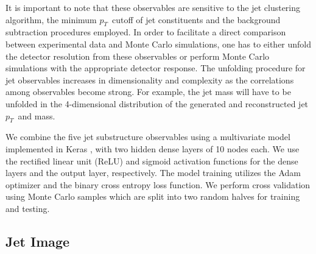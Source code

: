 \documentclass[notoc]{JHEP3}
\newcommand{\pt}{$p_{T}$}
\newcommand{\jw}{\textsc{Jewel}~}
\begin{document}
It is important to note that these observables are sensitive to the jet clustering algorithm, the minimum \pt ~cutoff of jet constituents and the background subtraction procedures employed. In order to facilitate a direct comparison between experimental data and Monte Carlo simulations, one has to either unfold the detector resolution from these observables or perform Monte Carlo simulations with the appropriate detector response. The unfolding procedure for jet observables increases in dimensionality and complexity as the correlations among observables become strong. For example, the jet mass will have to be unfolded in the 4-dimensional distribution of the generated and reconstructed jet \pt ~and mass.

We combine the five jet substructure observables using a multivariate model implemented in Keras \cite{keras}, with two hidden dense layers of 10 nodes each. We use the rectified linear unit (ReLU) \cite{nair2010rectified} and sigmoid activation functions for the dense layers and the output layer, respectively. The model training utilizes the Adam optimizer \cite{adam} and the binary cross entropy loss function. We perform cross validation using Monte Carlo samples which are split into two random halves for training and testing. 


\subsection{Jet Image}
\label{sec:image}
\end{document}
